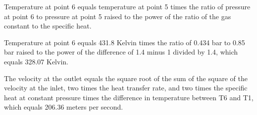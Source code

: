 Temperature at point 6 equals temperature at point 5 times the ratio of pressure at point 6 to pressure at point 5 raised to the power of the ratio of the gas constant to the specific heat.

Temperature at point 6 equals 431.8 Kelvin times the ratio of 0.434 bar to 0.85 bar raised to the power of the difference of 1.4 minus 1 divided by 1.4, which equals 328.07 Kelvin.

The velocity at the outlet equals the square root of the sum of the square of the velocity at the inlet, two times the heat transfer rate, and two times the specific heat at constant pressure times the difference in temperature between T6 and T1, which equals 206.36 meters per second.